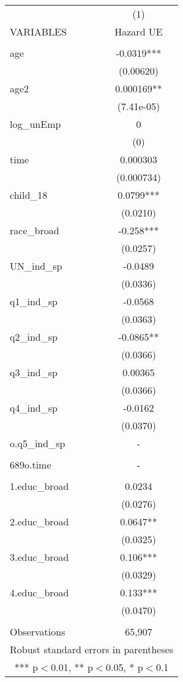 \documentclass[]{article}
\begin{document}
\begin{tabular}{lc} \hline
 & (1) \\
VARIABLES & Hazard UE \\ \hline
 &  \\
age & -0.0319*** \\
 & (0.00620) \\
age2 & 0.000169** \\
 & (7.41e-05) \\
log\_unEmp & 0 \\
 & (0) \\
time & 0.000303 \\
 & (0.000734) \\
child\_18 & 0.0799*** \\
 & (0.0210) \\
race\_broad & -0.258*** \\
 & (0.0257) \\
UN\_ind\_sp & -0.0489 \\
 & (0.0336) \\
q1\_ind\_sp & -0.0568 \\
 & (0.0363) \\
q2\_ind\_sp & -0.0865** \\
 & (0.0366) \\
q3\_ind\_sp & 0.00365 \\
 & (0.0366) \\
q4\_ind\_sp & -0.0162 \\
 & (0.0370) \\
o.q5\_ind\_sp & - \\
 &  \\
689o.time & - \\
 &  \\
1.educ\_broad & 0.0234 \\
 & (0.0276) \\
2.educ\_broad & 0.0647** \\
 & (0.0325) \\
3.educ\_broad & 0.106*** \\
 & (0.0329) \\
4.educ\_broad & 0.133*** \\
 & (0.0470) \\
 &  \\
 Observations & 65,907 \\ \hline
\multicolumn{2}{c}{ Robust standard errors in parentheses} \\
\multicolumn{2}{c}{ *** p$<$0.01, ** p$<$0.05, * p$<$0.1} \\
\end{tabular}
\end{document}
